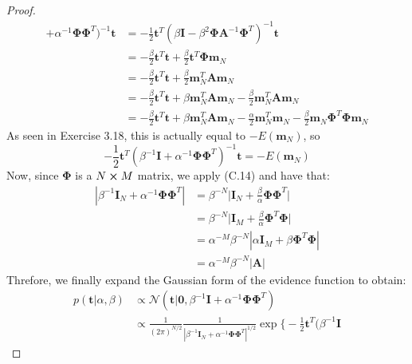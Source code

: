 \begin{proof}
\begin{align*}
            + \alpha^{-1}\mathbf{\Phi}\mathbf{\Phi}^T)^{-1}\mathbf{t}
        &= -\frac{1}{2}\mathbf{t}^T (\beta\mathbf{I} 
            - \beta^2\mathbf{\Phi}\mathbf{A}^{-1}\mathbf{\Phi}^T)^{-1}\mathbf{t} \\
        &= -\frac{\beta}{2} \mathbf{t}^T\mathbf{t} 
            + \frac{\beta}{2} \mathbf{t}^T\mathbf{\Phi}\mathbf{m}_N \\
        &= -\frac{\beta}{2} \mathbf{t}^T\mathbf{t} 
            + \frac{\beta}{2} \mathbf{m}_N^T\mathbf{A}\mathbf{m}_N \\
        &= -\frac{\beta}{2} \mathbf{t}^T\mathbf{t} + \beta \mathbf{m}_N^T\mathbf{A}\mathbf{m}_N 
            - \frac{\beta}{2}\mathbf{m}_N^T\mathbf{A}\mathbf{m}_N \\
        &= -\frac{\beta}{2} \mathbf{t}^T\mathbf{t} + \beta \mathbf{m}_N^T\mathbf{A}\mathbf{m}_N 
            - \frac{\alpha}{2}\mathbf{m}_N^T\mathbf{m}_N 
            - \frac{\beta}{2} \mathbf{m}_N\mathbf{\Phi}^T\mathbf{\Phi}\mathbf{m}_N
    \end{align*}
    As seen in Exercise 3.18, this is actually equal to $-E(\mathbf{m}_N)$, so
    \[
        -\frac{1}{2}\mathbf{t}^T(\beta^{-1}\mathbf{I} 
            + \alpha^{-1}\mathbf{\Phi}\mathbf{\Phi}^T)^{-1}\mathbf{t}
        = -E(\mathbf{m}_N)
    \] 
    Now, since $\mathbf{\Phi}$ is a $N \cross M$ matrix, we apply (C.14) and have that:
    \begin{align*}
        |\beta^{-1}\mathbf{I}_N + \alpha^{-1}\mathbf{\Phi}\mathbf{\Phi}^T|
        &= \beta^{-N} \bigg|\mathbf{I}_N + \frac{\beta}{\alpha} 
            \mathbf{\Phi}\mathbf{\Phi}^T\bigg| \\
        &= \beta^{-N} \bigg|\mathbf{I}_M 
            + \frac{\beta}{\alpha}\mathbf{\Phi}^T\mathbf{\Phi}\bigg| \\
        &= \alpha^{-M}\beta^{-N}|\alpha\mathbf{I}_M + \beta\mathbf{\Phi}^T\mathbf{\Phi}| \\
        &= \alpha^{-M}\beta^{-N}|\mathbf{A}|
    \end{align*}
    Threfore, we finally expand the Gaussian form of the evidence function to obtain:
    \begin{align*}
        p(\mathbf{t} | \alpha, \beta) 
        &\propto \mathcal{N}(\mathbf{t} | \mathbf{0}, \beta^{-1}\mathbf{I} 
            + \alpha^{-1}\mathbf{\Phi}\mathbf{\Phi}^T) \\
        &\propto \frac{1}{(2\pi)^{N/2}} 
            \frac{1}{|\beta^{-1}\mathbf{I}_N + \alpha^{-1}\mathbf{\Phi}\mathbf{\Phi}^T|^{1/2}}
            \exp\bigg\{-\frac{1}{2}\mathbf{t}^T(\beta^{-1}\mathbf{I} 

\end{align*}
\end{proof}

